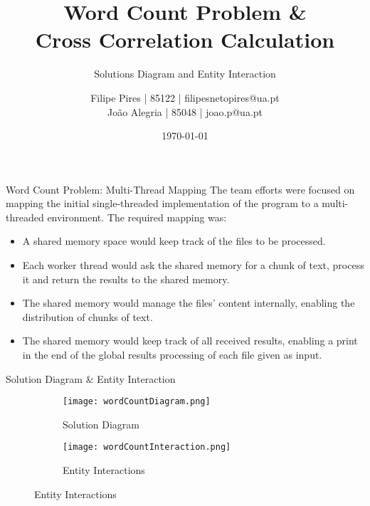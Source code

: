 \documentclass{beamer}
\title{Word Count Problem \& \\Cross Correlation Calculation}
\subtitle{Solutions Diagram and Entity Interaction}
\author{Filipe Pires | 85122 | filipesnetopires@ua.pt \\ João Alegria | 85048 | joao.p@ua.pt}
\institute{University of Aveiro, DETI}
\date{\today}
\begin{document}

\begin{frame}
	\maketitle %
\end{frame}


\begin{frame}{Word Count Problem: Multi-Thread Mapping}
	The team efforts were focused on mapping the initial single-threaded implementation of the program to a multi-threaded environment.
	The required mapping was:
	\begin{itemize}
		\item A shared memory space would keep track of the files to be processed.
		\item Each worker thread would ask the shared memory for a chunk of text, process it and return the results to the shared memory.
		\item The shared memory would manage the files' content internally, enabling the distribution of chunks of text.
		\item The shared memory would keep track of all received results, enabling a print in the end of the global results processing of each file given as input.
	\end{itemize}
\end{frame}


\begin{frame}{Solution Diagram \& Entity Interaction}
	\begin{figure}
		\begin{subfigure}{.49\textwidth}
			\hspace*{-.3in}
			\texttt{[image: wordCountDiagram.png]}
			\caption{Solution Diagram}
			\label{wordDiagram}
		\end{subfigure}	
		\begin{subfigure}{.49\textwidth}
			\hspace*{.1in}
			\texttt{[image: wordCountInteraction.png]}
			\caption{Entity Interactions}
			\label{wordInteraction}
		\end{subfigure}
	\end{figure}
\end{frame}
\end{document}
